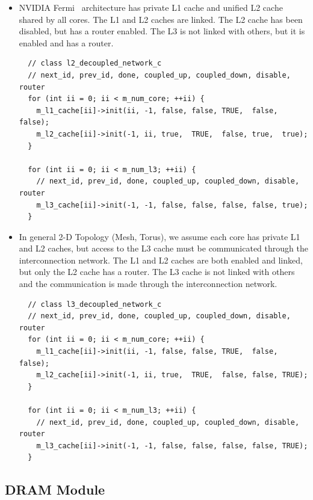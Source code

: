 \begin{itemize}
\begin{lstlisting}
  \end{lstlisting}
  \smallskip

  \item NVIDIA Fermi~\cite{fermi} architecture has private L1 cache
  and unified L2 cache shared by all cores. The L1 and L2 caches are
  linked. The L2 cache has been disabled, but has a router
  enabled. The L3 is not linked with others, but it is enabled and has
  a router.

  \smallskip
  \begin{lstlisting}
  // class l2_decoupled_network_c
  // next_id, prev_id, done, coupled_up, coupled_down, disable, router
  for (int ii = 0; ii < m_num_core; ++ii) {
    m_l1_cache[ii]->init(ii, -1, false, false, TRUE,  false, false);
    m_l2_cache[ii]->init(-1, ii, true,  TRUE,  false, true,  true);
  }

  for (int ii = 0; ii < m_num_l3; ++ii) {
    // next_id, prev_id, done, coupled_up, coupled_down, disable, router
    m_l3_cache[ii]->init(-1, -1, false, false, false, false, true);
  }

  \end{lstlisting}
  \smallskip
  
  \item In general 2-D Topology (Mesh, Torus), we assume each core has
  private L1 and L2 caches, but access to the L3 cache must be
  communicated through the interconnection network. The L1 and L2
  caches are both enabled and linked, but only the L2 cache has a
  router. The L3 cache is not linked with others and the communication
  is made through the interconnection network.

  \smallskip
  \begin{lstlisting}
  // class l3_decoupled_network_c
  // next_id, prev_id, done, coupled_up, coupled_down, disable, router
  for (int ii = 0; ii < m_num_core; ++ii) {
    m_l1_cache[ii]->init(ii, -1, false, false, TRUE,  false, false);
    m_l2_cache[ii]->init(-1, ii, true,  TRUE,  false, false, TRUE);
  }

  for (int ii = 0; ii < m_num_l3; ++ii) {
    // next_id, prev_id, done, coupled_up, coupled_down, disable, router
    m_l3_cache[ii]->init(-1, -1, false, false, false, false, TRUE);
  }

  \end{lstlisting}
  \smallskip

\end{itemize}

\subsection{DRAM Module} 

